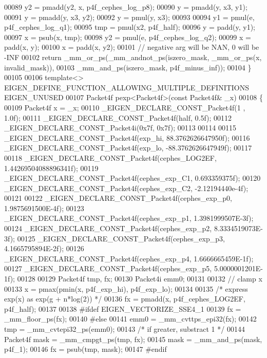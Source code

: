 \begin{DoxyCode}
00089   y2 = pmadd(y2, x, p4f\_cephes\_log\_p8);
00090   y = pmadd(y, x3, y1);
00091   y = pmadd(y, x3, y2);
00092   y = pmul(y, x3);
00093 
00094   y1 = pmul(e, p4f\_cephes\_log\_q1);
00095   tmp = pmul(x2, p4f\_half);
00096   y = padd(y, y1);
00097   x = psub(x, tmp);
00098   y2 = pmul(e, p4f\_cephes\_log\_q2);
00099   x = padd(x, y);
00100   x = padd(x, y2);
00101   \textcolor{comment}{// negative arg will be NAN, 0 will be -INF}
00102   \textcolor{keywordflow}{return} \_mm\_or\_ps(\_mm\_andnot\_ps(iszero\_mask, \_mm\_or\_ps(x, invalid\_mask)),
00103                    \_mm\_and\_ps(iszero\_mask, p4f\_minus\_inf));
00104 \}
00105 
00106 \textcolor{keyword}{template}<> EIGEN\_DEFINE\_FUNCTION\_ALLOWING\_MULTIPLE\_DEFINITIONS EIGEN\_UNUSED
00107 Packet4f pexp<Packet4f>(\textcolor{keyword}{const} Packet4f& \_x)
00108 \{
00109   Packet4f x = \_x;
00110   \_EIGEN\_DECLARE\_CONST\_Packet4f(1 , 1.0f);
00111   \_EIGEN\_DECLARE\_CONST\_Packet4f(half, 0.5f);
00112   \_EIGEN\_DECLARE\_CONST\_Packet4i(0x7f, 0x7f);
00113 
00114 
00115   \_EIGEN\_DECLARE\_CONST\_Packet4f(exp\_hi,  88.3762626647950f);
00116   \_EIGEN\_DECLARE\_CONST\_Packet4f(exp\_lo, -88.3762626647949f);
00117 
00118   \_EIGEN\_DECLARE\_CONST\_Packet4f(cephes\_LOG2EF, 1.44269504088896341f);
00119   \_EIGEN\_DECLARE\_CONST\_Packet4f(cephes\_exp\_C1, 0.693359375f);
00120   \_EIGEN\_DECLARE\_CONST\_Packet4f(cephes\_exp\_C2, -2.12194440e-4f);
00121 
00122   \_EIGEN\_DECLARE\_CONST\_Packet4f(cephes\_exp\_p0, 1.9875691500E-4f);
00123   \_EIGEN\_DECLARE\_CONST\_Packet4f(cephes\_exp\_p1, 1.3981999507E-3f);
00124   \_EIGEN\_DECLARE\_CONST\_Packet4f(cephes\_exp\_p2, 8.3334519073E-3f);
00125   \_EIGEN\_DECLARE\_CONST\_Packet4f(cephes\_exp\_p3, 4.1665795894E-2f);
00126   \_EIGEN\_DECLARE\_CONST\_Packet4f(cephes\_exp\_p4, 1.6666665459E-1f);
00127   \_EIGEN\_DECLARE\_CONST\_Packet4f(cephes\_exp\_p5, 5.0000001201E-1f);
00128 
00129   Packet4f tmp, fx;
00130   Packet4i emm0;
00131 
00132   \textcolor{comment}{// clamp x}
00133   x = pmax(pmin(x, p4f\_exp\_hi), p4f\_exp\_lo);
00134 
00135   \textcolor{comment}{/* express exp(x) as exp(g + n*log(2)) */}
00136   fx = pmadd(x, p4f\_cephes\_LOG2EF, p4f\_half);
00137 
00138 \textcolor{preprocessor}{#ifdef EIGEN\_VECTORIZE\_SSE4\_1}
00139   fx = \_mm\_floor\_ps(fx);
00140 \textcolor{preprocessor}{#else}
00141   emm0 = \_mm\_cvttps\_epi32(fx);
00142   tmp  = \_mm\_cvtepi32\_ps(emm0);
00143   \textcolor{comment}{/* if greater, substract 1 */}
00144   Packet4f mask = \_mm\_cmpgt\_ps(tmp, fx);
00145   mask = \_mm\_and\_ps(mask, p4f\_1);
00146   fx = psub(tmp, mask);
00147 \textcolor{preprocessor}{#endif}

\end{DoxyCode}

